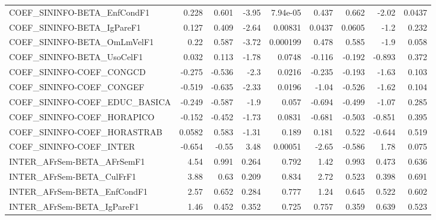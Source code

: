 \begin{tabular}{lrrrrrrrr}
COEF\_SININFO-BETA\_EnfCondF1           &       0.228 &        0.601 &   -3.95 & 7.94e-05 &      0.437 &       0.662 &        -2.02 &        0.0437 \\
COEF\_SININFO-BETA\_IgPareF1            &       0.127 &        0.409 &   -2.64 &  0.00831 &     0.0437 &      0.0605 &         -1.2 &         0.232 \\
COEF\_SININFO-BETA\_OmLmVelF1           &        0.22 &        0.587 &   -3.72 & 0.000199 &      0.478 &       0.585 &         -1.9 &         0.058 \\
COEF\_SININFO-BETA\_UsoCelF1            &       0.032 &        0.113 &   -1.78 &   0.0748 &     -0.116 &      -0.192 &       -0.893 &         0.372 \\
COEF\_SININFO-COEF\_CONGCD              &      -0.275 &       -0.536 &    -2.3 &   0.0216 &     -0.235 &      -0.193 &        -1.63 &         0.103 \\
COEF\_SININFO-COEF\_CONGEF              &      -0.519 &       -0.635 &   -2.33 &   0.0196 &      -1.04 &      -0.526 &        -1.62 &         0.104 \\
COEF\_SININFO-COEF\_EDUC\_BASICA         &      -0.249 &       -0.587 &    -1.9 &    0.057 &     -0.694 &      -0.499 &        -1.07 &         0.285 \\
COEF\_SININFO-COEF\_HORAPICO            &      -0.152 &       -0.452 &   -1.73 &   0.0831 &     -0.681 &      -0.503 &       -0.851 &         0.395 \\
COEF\_SININFO-COEF\_HORASTRAB           &      0.0582 &        0.583 &   -1.31 &    0.189 &      0.181 &       0.522 &       -0.644 &         0.519 \\
COEF\_SININFO-COEF\_INTER               &      -0.654 &        -0.55 &    3.48 &  0.00051 &      -2.65 &      -0.586 &         1.78 &         0.075 \\
INTER\_AFrSem-BETA\_AFrSemF1            &        4.54 &        0.991 &   0.264 &    0.792 &       1.42 &       0.993 &        0.473 &         0.636 \\
INTER\_AFrSem-BETA\_CulFrF1             &        3.88 &         0.63 &   0.209 &    0.834 &       2.72 &       0.523 &        0.398 &         0.691 \\
INTER\_AFrSem-BETA\_EnfCondF1           &        2.57 &        0.652 &   0.284 &    0.777 &       1.24 &       0.645 &        0.522 &         0.602 \\
INTER\_AFrSem-BETA\_IgPareF1            &        1.46 &        0.452 &   0.352 &    0.725 &      0.757 &       0.359 &        0.639 &         0.523 \\

\end{tabular}
